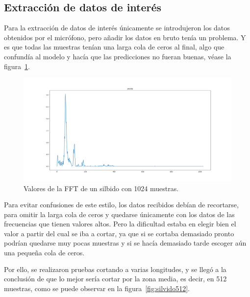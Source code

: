 \documentclass[a4paper, 12pt]{book}
\begin{document}
\subsection{Extracción de datos de interés}
\label{subsec:extraccion-datos}

Para la extracción de datos de interés únicamente se introdujeron los datos obtenidos por el micrófono, pero añadir los datos en bruto tenía un problema. Y es que todas las muestras tenían una larga cola de ceros al final, algo que confundía al modelo y hacía que las predicciones no fueran buenas, véase la figura~\ref{fig:silvido1024}.

\begin{figure}
	\centering
	\includegraphics[width=12cm, keepaspectratio]{img/silvido1024.png}
	\caption{Valores de la FFT de un silbido con 1024 muestras.}\label{fig:silvido1024}
\end{figure}

Para evitar confusiones de este estilo, los datos recibidos debían de recortarse, para omitir la larga cola de ceros y quedarse únicamente con los datos de las frecuencias que tienen valores altos. Pero la dificultad estaba en elegir bien el valor a partir del cual se iba a cortar, ya que si se cortaba demasiado pronto podrían quedarse muy pocas muestras y si se hacía demasiado tarde escoger aún una pequeña cola de ceros.

Por ello, se realizaron pruebas cortando a varias longitudes, y se llegó a la conclusión de que lo mejor sería cortar por la zona media, es decir, en 512 muestras, como se puede observar en la figura~\ref{fig:silvido512}.
\end{document}

